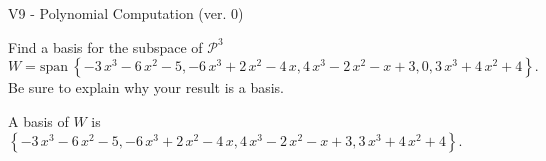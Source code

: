 \begin{exercise}
  \begin{exerciseTitle}V9 - Polynomial Computation (ver. 0)\end{exerciseTitle}
  \begin{exerciseStatement}
    Find a basis for the subspace of \(\mathcal{P}^3\) 
\[W=\mathrm{span}\ \left\{-3 \, x^{3} - 6 \, x^{2} - 5 , -6 \, x^{3} + 2 \, x^{2} - 4 \, x , 4 \, x^{3} - 2 \, x^{2} - x + 3 , 0 , 3 \, x^{3} + 4 \, x^{2} + 4\right\}.\]
 Be sure to explain why your result is a basis.


  \end{exerciseStatement}
  \begin{exerciseAnswer}
   A basis of \(W\) is  \(\left\{-3 \, x^{3} - 6 \, x^{2} - 5 , -6 \, x^{3} + 2 \, x^{2} - 4 \, x , 4 \, x^{3} - 2 \, x^{2} - x + 3 , 3 \, x^{3} + 4 \, x^{2} + 4\right\}\).
  


  \end{exerciseAnswer}
\end{exercise}